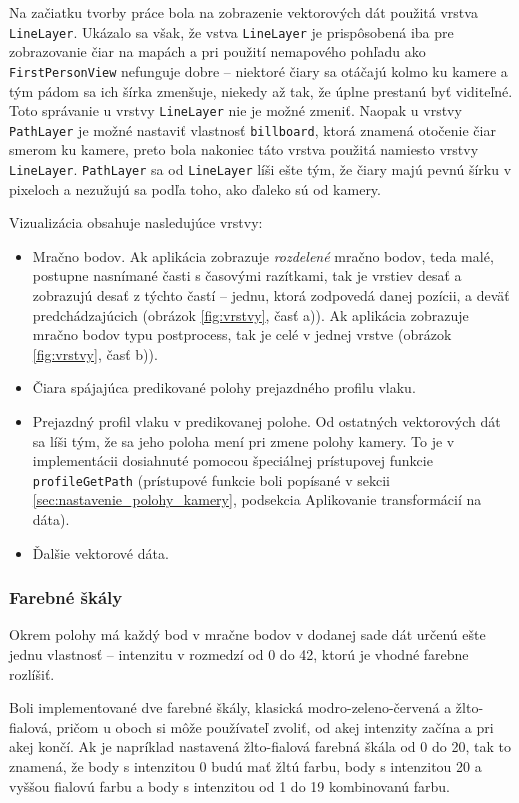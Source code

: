 Na začiatku tvorby práce bola na zobrazenie vektorových dát použitá vrstva \texttt{LineLayer}. Ukázalo sa však, že vstva \texttt{LineLayer} je prispôsobená iba pre zobrazovanie čiar na mapách a pri použití nemapového pohľadu ako \texttt{FirstPersonView} nefunguje dobre -- niektoré čiary sa otáčajú kolmo ku kamere a tým pádom sa ich šírka zmenšuje, niekedy až tak, že úplne prestanú byť viditeľné. Toto správanie u vrstvy \texttt{LineLayer} nie je možné zmeniť. Naopak u vrstvy \texttt{PathLayer} je možné nastaviť vlastnosť \texttt{billboard}, ktorá znamená otočenie čiar smerom ku kamere, preto bola nakoniec táto vrstva použitá namiesto vrstvy \texttt{LineLayer}. \texttt{PathLayer} sa od \texttt{LineLayer} líši ešte tým, že čiary majú pevnú šírku v pixeloch a nezužujú sa podľa toho, ako ďaleko sú od kamery.

Vizualizácia obsahuje nasledujúce vrstvy:
\begin{itemize}
    \item Mračno bodov. Ak aplikácia zobrazuje \emph{rozdelené} mračno bodov, teda malé, postupne nasnímané časti s časovými razítkami, tak je vrstiev desať a zobrazujú desať z týchto častí -- jednu, ktorá zodpovedá danej pozícii, a deväť predchádzajúcich (obrázok \ref{fig:vrstvy}, časť a)). Ak aplikácia zobrazuje mračno bodov typu postprocess, tak je celé v jednej vrstve (obrázok \ref{fig:vrstvy}, časť b)).
    \item Čiara spájajúca predikované polohy prejazdného profilu vlaku.
    \item Prejazdný profil vlaku v predikovanej polohe. Od ostatných vektorových dát sa líši tým, že sa jeho poloha mení pri zmene polohy kamery. To je v implementácii dosiahnuté pomocou špeciálnej prístupovej funkcie \texttt{profileGetPath} (prístupové funkcie boli popísané v sekcii \ref{sec:nastavenie_polohy_kamery}, podsekcia Aplikovanie transformácií na dáta). 
    \item Ďalšie vektorové dáta.
\end{itemize}

\subsubsection{Farebné škály}

Okrem polohy má každý bod v mračne bodov v dodanej sade dát určenú ešte jednu vlastnosť -- intenzitu v rozmedzí od 0 do 42, ktorú je vhodné farebne rozlíšiť.

Boli implementované dve farebné škály, klasická modro-zeleno-červená a žlto-fialová, pričom u oboch si môže používateľ zvoliť, od akej intenzity začína a pri akej končí. Ak je napríklad nastavená žlto-fialová farebná škála od 0 do 20, tak to znamená, že body s intenzitou 0 budú mať žltú farbu, body s intenzitou 20 a vyššou fialovú farbu a body s intenzitou od 1 do 19 kombinovanú farbu.

